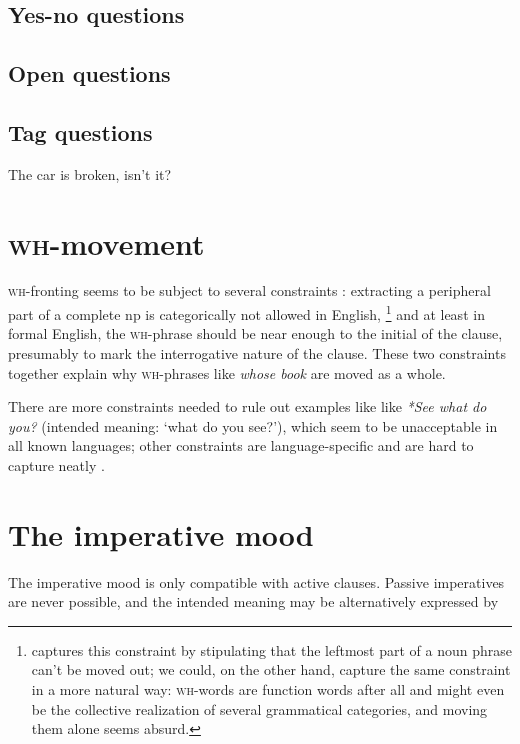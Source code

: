 \documentclass[UTF8, a4paper, oneside, scheme=plain, 12pt]{ctexbook}
\newcommand{\form}[1]{\emph{#1}}
\newcommand{\category}[1]{\textsc{#1}}
\newcommand{\translate}[1]{`#1'}
\begin{document}
\subsection{Yes-no questions}

\subsection{Open questions}

\subsection{Tag questions}

\begin{exe}
    \ex The car is broken, isn't it?
\end{exe}

\section{\category{wh}-movement}

\category{wh}-fronting seems to be subject to several constraints \citep{cable2012pied}:
extracting a peripheral part of a complete \acs{np} is categorically not allowed in English,%
\footnote{
    \citet{cable2012pied} captures this constraint 
    by stipulating that the leftmost part of a noun phrase can't be moved out; 
    we could, on the other hand, capture the same constraint in a more natural way:
    \category{wh}-words are function words after all
    and might even be the collective realization of several grammatical categories, 
    and moving them alone seems absurd.
} 
and at least in formal English, the \category{wh}-phrase 
should be near enough to the initial of the clause, 
presumably to mark the interrogative nature of the clause.
These two constraints together explain why \category{wh}-phrases 
like \form{whose book} are moved as a whole.

There are more constraints needed to rule out examples like
like \form{*See what do you?} (intended meaning: \translate{what do you see?}),
which seem to be unacceptable in all known languages;
other constraints are language-specific and are hard to capture neatly \citep{cable2013pied}.


\section{The imperative mood}

The imperative mood is only compatible with active clauses.
Passive imperatives are never possible, 
and the intended meaning may be alternatively expressed by 
\end{document}
